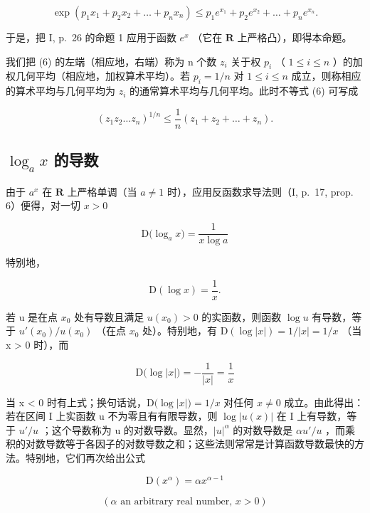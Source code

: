 \[
\exp \left(p _ {1} x _ {1} + p _ {2} x _ {2} + \dots + p _ {n} x _ {n}\right) \leqslant p _ {1} e ^ {x _ {1}} + p _ {2} e ^ {x _ {2}} + \dots + p _ {n} e ^ {x _ {n}}.\tag{7}
\]

于是，把 I, p.~26 的命题 1 应用于函数 \(e^x\) （它在 \(\mathbf{R}\) 上严格凸），即得本命题。

我们把 (6) 的左端（相应地，右端）称为 n 个数 \(z_{i}\) 关于权 \(p_{i}\) （ \(1 \leqslant i \leqslant n\) ）的加权几何平均（相应地，加权算术平均）。若 \(p_{i} = 1/n\) 对 \(1 \leqslant i \leqslant n\) 成立，则称相应的算术平均与几何平均为 \(z_{i}\) 的通常算术平均与几何平均。此时不等式 (6) 可写成

\[
\left(z _ {1} z _ {2} \dots z _ {n}\right) ^ {1 / n} \leqslant \frac {1}{n} \left(z _ {1} + z _ {2} + \dots + z _ {n}\right).\tag{8}
\]

\subsection{\texorpdfstring{\(\log_a x\) 的导数}{以 a 为底的 x 的对数之导数}}

由于 \(a^x\) 在 \(\mathbf{R}\) 上严格单调（当 \(a \neq 1\) 时），应用反函数求导法则（I, p.~17, prop. 6）便得，对一切 \(x > 0\)

\[
\mathrm{D} \big (\log_ {a} x \big) = \frac {1}{x \log a}\tag{9}
\]

特别地，

\[
\mathrm{D} (\log x) = \frac {1}{x}.\tag{10}
\]

若 u 是在点 \(x_{0}\) 处有导数且满足 \(u(x_{0}) > 0\) 的实函数，则函数 \(\log u\) 有导数，等于 \(u'(x_{0})/u(x_{0})\) （在点 \(x_{0}\) 处）。特别地，有 \(\mathrm{D}\left(\log |x|\right) = 1/|x| = 1/x\) （当 x \textgreater{} 0 时），而

\[
\mathrm{D} \big (\log | x | \big) = - \frac {1}{| x |} = \frac {1}{x}
\]

当 x \textless{} 0 时有上式；换句话说，\(\mathrm{D}\big(\log|x|\big) = 1/x\) 对任何 \(x \neq 0\) 成立。由此得出：若在区间 I 上实函数 u 不为零且有有限导数，则 \(\log|u(x)|\) 在 I 上有导数，等于 \(u'/u\) ；这个导数称为 u 的对数导数。显然，\(|u|^{\alpha}\) 的对数导数是 \(\alpha u'/u\) ，而乘积的对数导数等于各因子的对数导数之和；这些法则常常是计算函数导数最快的方法。特别地，它们再次给出公式

\[
\mathrm{D} \left(x ^ {\alpha}\right) = \alpha x ^ {\alpha - 1}
\]

\[
(\alpha \text {   an   arbitrary   real   number,   } x > 0)\tag{11}
\]


